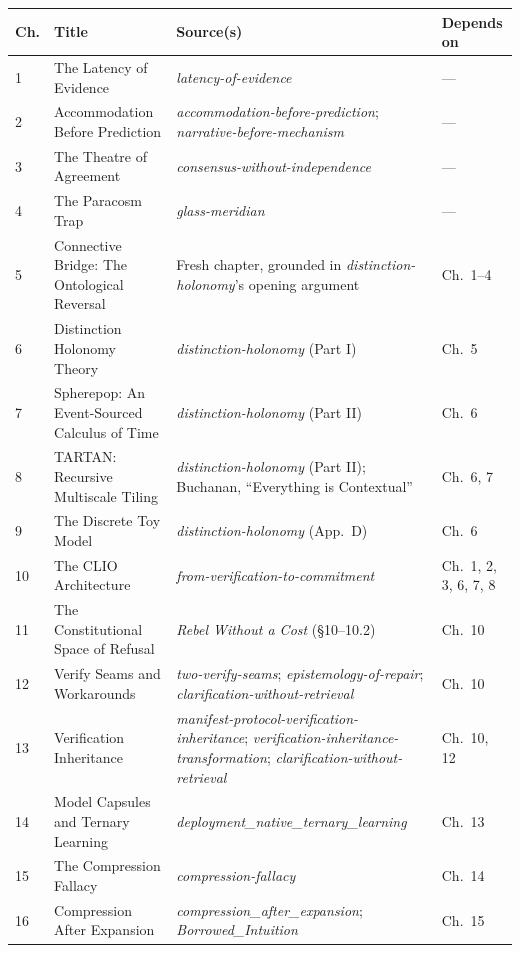 \begingroup
\small
\begin{longtable}{@{}p{0.6cm}p{4.6cm}p{5.3cm}p{2.3cm}@{}}
\toprule
\textbf{Ch.} & \textbf{Title} & \textbf{Source(s)} & \textbf{Depends on} \\
\midrule
\endhead
1 & The Latency of Evidence & \textit{latency-of-evidence} & --- \\
2 & Accommodation Before Prediction & \textit{accommodation-before-prediction}; \textit{narrative-before-mechanism} & --- \\
3 & The Theatre of Agreement & \textit{consensus-without-independence} & --- \\
4 & The Paracosm Trap & \textit{glass-meridian} & --- \\
5 & Connective Bridge: The Ontological Reversal & Fresh chapter, grounded in \textit{distinction-holonomy}'s opening argument & Ch.\ 1--4 \\
6 & Distinction Holonomy Theory & \textit{distinction-holonomy} (Part I) & Ch.\ 5 \\
7 & Spherepop: An Event-Sourced Calculus of Time & \textit{distinction-holonomy} (Part II) & Ch.\ 6 \\
8 & TARTAN: Recursive Multiscale Tiling & \textit{distinction-holonomy} (Part II); Buchanan, ``Everything is Contextual'' \cite{buchanan2026} & Ch.\ 6, 7 \\
9 & The Discrete Toy Model & \textit{distinction-holonomy} (App.\ D) & Ch.\ 6 \\
10 & The CLIO Architecture & \textit{from-verification-to-commitment} & Ch.\ 1, 2, 3, 6, 7, 8 \\
11 & The Constitutional Space of Refusal & \textit{Rebel Without a Cost} (\S 10--10.2) & Ch.\ 10 \\
12 & Verify Seams and Workarounds & \textit{two-verify-seams}; \textit{epistemology-of-repair}; \textit{clarification-without-retrieval} & Ch.\ 10 \\
13 & Verification Inheritance & \textit{manifest-protocol-verification-inheritance}; \textit{verification-inheritance-transformation}; \textit{clarification-without-retrieval} & Ch.\ 10, 12 \\
14 & Model Capsules and Ternary Learning & \textit{deployment\_native\_ternary\_learning} & Ch.\ 13 \\
15 & The Compression Fallacy & \textit{compression-fallacy} & Ch.\ 14 \\
16 & Compression After Expansion & \textit{compression\_after\_expansion}; \textit{Borrowed\_Intuition} & Ch.\ 15 \\

\end{longtable}
